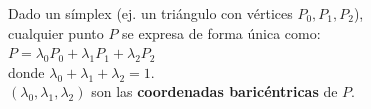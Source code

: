 \documentclass[preview]{standalone}
\begin{document}
\begin{center}
Dado un símplex (ej. un triángulo con vértices $P_0, P_1, P_2$),\\ cualquier punto $P$ se expresa de forma única como:\\$P = \lambda_0 P_0 + \lambda_1 P_1 + \lambda_2 P_2$\\donde $\lambda_0 + \lambda_1 + \lambda_2 = 1$.\\$(\lambda_0, \lambda_1, \lambda_2)$ son las \textbf{coordenadas baricéntricas} de $P$.
\end{center}
\end{document}
